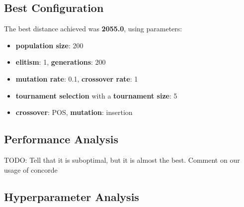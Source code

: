 \documentclass[11pt]{article}
\begin{document}
\subsection{Best Configuration}

The best distance achieved was \textbf{2055.0}, using parameters:
\begin{itemize}
    \item \textbf{population size}: 200
    \item \textbf{elitism}: 1,  \textbf{generations}: 200
    \item \textbf{mutation rate}: 0.1,  \textbf{crossover rate}: 1
    \item \textbf{tournament selection} with a \textbf{tournament size}: 5
    \item \textbf{crossover}: POS,   \textbf{mutation}: insertion
\end{itemize}

\subsection{Performance Analysis}
TODO: Tell that it is suboptimal, but it is almost the best. Comment on our usage of concorde

\subsection{Hyperparameter Analysis}
\end{document}
